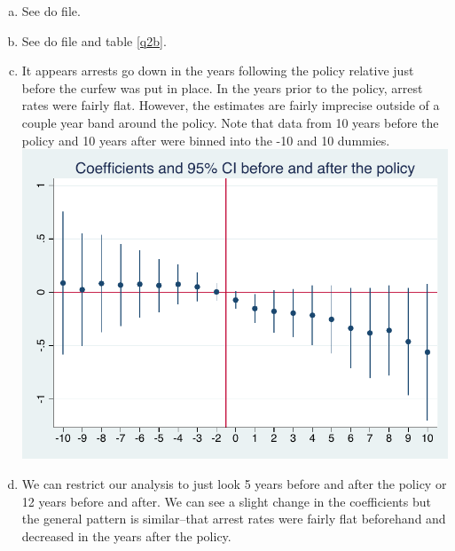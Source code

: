 \documentclass[11pt]{article}
\begin{document}
\begin{center}
\end{center}

\begin{enumerate}[(a)]
	\item See do file.
	\item See do file and table \ref{q2b}. \\
	
	\item  It appears arrests go down in the years following the policy relative just before the curfew was put in place. In the years prior to the policy, arrest rates were fairly flat. However, the estimates are fairly imprecise outside of a couple year band around the policy. Note that data from 10 years before the policy and 10 years after were binned into the -10 and 10 dummies.\\
	\includegraphics[scale=.8]{input/coef_plot_10year.pdf}
	\item We can restrict our analysis to just look 5 years before and after the policy or 12 years before and after. We can see a slight change in the coefficients but the general pattern is similar--that arrest rates were fairly flat beforehand and decreased in the years after the policy.\\

\end{enumerate}
\end{document}
